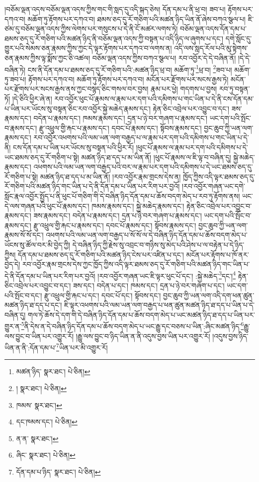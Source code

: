།བཅོམ་ལྡན་འདས་བཅོམ་ལྡན་འདས་ཀྱིས་གང་གི་སླད་དུ་འདི་སྐད་ཅེས། དོན་དམ་པ་ནི་ཕྲ་བ། ཟབ་པ། རྟོགས་པར་དཀའ་བ། མཆོག་ཏུ་རྟོགས་པར་དཀའ་བ། ཐམས་ཅད་དུ་རོ་གཅིག་པའི་མཚན་ཉིད་ཡིན་ནོ་ཞེས་བཀའ་སྩལ་པ། ཇི་ཙམ་དུ་བཅོམ་ལྡན་འདས་ཀྱིས་ལེགས་པར་གསུངས་པ་དེ་ནི་ངོ་མཚར་ལགས་ཏེ། བཅོམ་ལྡན་འདས་དོན་དམ་པ་ཐམས་ཅད་དུ་རོ་གཅིག་པའི་མཚན་ཉིད་ནི་བཅོམ་ལྡན་འདས་ཀྱི་བསྟན་པ་འདི་ཉིད་ལ་ཞུགས་པ་དང་། དགེ་སློང་དུ་གྱུར་པའི་སེམས་ཅན་རྣམས་ཀྱིས་ཀྱང་དེ་ལྟར་རྟོགས་པར་དཀའ་བ་ལགས་ན། འདི་ལས་སླད་རོལ་པའི་མུ་སྟེགས་ཅན་རྣམས་ཀྱིས་ལྟ་སྨོས་ཀྱང་ཅི་འཚལ། བཅོམ་ལྡན་འདས་ཀྱིས་བཀའ་སྩལ་པ། རབ་འབྱོར་དེ་དེ་བཞིན་ནོ། །དེ་དེ་བཞིན་ཏེ། ངས་ནི་དོན་དམ་པ་ཐམས་ཅད་དུ་རོ་གཅིག་པའི་:མཚན་ཉིད་ཕྲ་བ། མཆོག་ཏུ་\footnote{མཚན་ཉིད་  སྣར་ཐང་།  པེ་ཅིན། }ཕྲ་བ། \footnote{།    སྣར་ཐང་།  པེ་ཅིན། }ཟབ་པ། མཆོག་ཏུ་ཟབ་པ། རྟོགས་པར་དཀའ་བ། མཆོག་ཏུ་རྟོགས་པར་དཀའ་བ། མངོན་པར་རྫོགས་པར་སངས་རྒྱས་ཏེ། མངོན་པར་རྫོགས་པར་སངས་རྒྱས་ནས་ཀྱང་བསྙད་ཅིང་གསལ་བར་བྱས། རྣམ་པར་ཕྱེ། གདགས་པ་བྱས། རབ་ཏུ་བསྟན་ཏོ། །དེ་ཅིའི་ཕྱིར་ཞེ་ན། རབ་འབྱོར་ཕུང་པོ་རྣམས་ལ་རྣམ་པར་དག་པའི་དམིགས་པ་གང་ཡིན་པ་དེ་ནི་ངས་དོན་དམ་པ་ཡིན་པར་ཡོངས་སུ་བསྟན་ཅིང་རབ་འབྱོར་སྐྱེ་མཆེད་རྣམས་དང་། རྟེན་ཅིང་འབྲེལ་པར་འབྱུང་བ་དང་། ཟས་རྣམས་དང་། བདེན་པ་རྣམས་དང་། ཁམས་རྣམས་དང་། དྲན་པ་ཉེ་བར་གཞག་པ་རྣམས་དང་། ཡང་དག་པའི་སྤོང་བ་རྣམས་དང་། རྫུ་འཕྲུལ་གྱི་རྐང་པ་རྣམས་དང་། དབང་པོ་རྣམས་དང་། སྟོབས་རྣམས་དང་། བྱང་ཆུབ་ཀྱི་ཡན་ལག་རྣམས་དང་། རབ་འབྱོར་འཕགས་པའི་ལམ་ཡན་ལག་བརྒྱད་པ་ལ་རྣམ་པར་དག་པའི་དམིགས་པ་གང་ཡིན་པ་དེ་ནི། ངས་དོན་དམ་པ་ཡིན་པར་ཡོངས་སུ་བསྟན་པའི་ཕྱིར་རོ། །ཕུང་པོ་རྣམས་ལ་རྣམ་པར་དག་པའི་དམིགས་པ་དེ་ཡང་ཐམས་ཅད་དུ་རོ་གཅིག་པ་སྟེ། མཚན་ཉིད་ཐ་དད་པ་མ་ཡིན་ནོ། །ཕུང་པོ་རྣམས་ལ་ཇི་ལྟ་བ་བཞིན་དུ། སྐྱེ་མཆེད་རྣམས་དང་། འཕགས་པའི་ལམ་ཡན་ལག་བརྒྱད་པའི་བར་ལ་རྣམ་པར་དག་པའི་དམིགས་པ་དེ་ཡང་ཐམས་ཅད་དུ་རོ་གཅིག་པ་སྟེ། མཚན་ཉིད་ཐ་དད་པ་མ་ཡིན་ནོ། །རབ་འབྱོར་རྣམ་གྲངས་དེས་ན། ཁྱོད་ཀྱིས་འདི་ལྟར་ཐམས་ཅད་དུ་རོ་གཅིག་པའི་མཚན་ཉིད་གང་ཡིན་པ་དེ་ནི་དོན་དམ་པ་ཡིན་པར་རིག་པར་བྱའོ། །རབ་འབྱོར་གཞན་ཡང་དགེ་སློང་རྣལ་འབྱོར་སྤྱོད་པ་ནི་ཕུང་པོ་གཅིག་གི་དེ་བཞིན་ཉིད་དོན་དམ་པ་ཆོས་བདག་མེད་པ་རབ་ཏུ་རྟོགས་ནས། ཡང་དེ་ལས་གཞན་པའི་ཕུང་པོ་རྣམས་དང་། ཁམས་རྣམས་དང་། སྐྱེ་མཆེད་རྣམས་དང་། རྟེན་ཅིང་འབྲེལ་པར་འབྱུང་བ་རྣམས་དང་། ཟས་རྣམས་དང་། བདེན་པ་རྣམས་དང་། དྲན་པ་ཉེ་བར་གཞག་པ་རྣམས་དང་། ཡང་དག་པའི་སྤོང་བ་རྣམས་དང་། རྫུ་འཕྲུལ་གྱི་རྐང་པ་རྣམས་དང་། དབང་པོ་རྣམས་དང་། སྟོབས་རྣམས་དང་། བྱང་ཆུབ་ཀྱི་ཡན་ལག་རྣམས་སོ་སོ་དང་། འཕགས་པའི་ལམ་ཡན་ལག་བརྒྱད་པ་སོ་སོ་ལ་དེ་བཞིན་ཉིད་དོན་དམ་པ་ཆོས་བདག་མེད་པ་ཡོངས་སུ་ཚོལ་བར་མི་བྱེད་ཀྱི། དེ་བཞིན་ཉིད་ཀྱི་རྗེས་སུ་འབྲང་བ་གཉིས་སུ་མེད་པའི་ཤེས་པ་ལ་བརྟེན་པ་དེ་ཉིད་ཀྱིས། དོན་དམ་པ་ཐམས་ཅད་དུ་རོ་གཅིག་པའི་མཚན་ཉིད་ངེས་པར་འཛིན་པ་དང་། མངོན་པར་རྟོགས་པ་ཁོ་ནར་བྱེད་དེ། རབ་འབྱོར་རྣམ་གྲངས་དེས་ཀྱང་ཁྱོད་ཀྱིས་འདི་ལྟར་ཐམས་ཅད་དུ་རོ་གཅིག་པའི་མཚན་ཉིད་གང་ཡིན་པ་དེ་ནི་དོན་དམ་པ་ཡིན་པར་རིག་པར་བྱའོ། །རབ་འབྱོར་གཞན་ཡང་ཇི་ལྟར་ཕུང་པོ་དང་། :སྐྱེ་མཆེད་\footnote{ཁམས་  སྣར་ཐང་། }དང་།\footnote{དང་ཁམས་དང་།  པེ་ཅིན། } རྟེན་ཅིང་འབྲེལ་པར་འབྱུང་བ་དང་། ཟས་དང་། བདེན་པ་དང་། ཁམས་དང་། དྲན་པ་ཉེ་བར་གཞག་པ་དང་། ཡང་དག་པའི་སྤོང་བ་དང་། རྫུ་འཕྲུལ་གྱི་རྐང་པ་དང་། དབང་པོ་དང་། སྟོབས་དང་། བྱང་ཆུབ་ཀྱི་ཡན་ལག་འདི་དག་ཕན་ཚུན་མཚན་ཉིད་ཐ་དད་པ་དང་། ཇི་ལྟར་འཕགས་པའི་ལམ་ཡན་ལག་བརྒྱད་པ་ཕན་ཚུན་མཚན་ཉིད་ཐ་དད་པ་ཡིན་པ་དེ་བཞིན་དུ། གལ་ཏེ་ཆོས་དེ་དག་གི་དེ་བཞིན་ཉིད་དོན་དམ་པ་ཆོས་བདག་མེད་པ་ཡང་མཚན་ཉིད་ཐ་དད་པ་ཡིན་པར་གྱུར་ན་\footnote{ན་ན་  སྣར་ཐང་། }ནི་དེས་ན་དེ་བཞིན་ཉིད་དོན་དམ་པ་ཆོས་བདག་མེད་པ་ཡང་རྒྱུ་དང་བཅས་པ་ཡིན་:ཞིང་མཚན་ཉིད་\footnote{ཞིང་  སྣར་ཐང་།  པེ་ཅིན། }རྒྱུ་ལས་བྱུང་བ་ཡིན་པར་འགྱུར་རོ། །རྒྱུ་ལས་བྱུང་བ་ཉིད་ཡིན་ན་ནི་འདུས་བྱས་ཡིན་པར་འགྱུར་རོ། །འདུས་བྱས་ཉིད་ཡིན་ན་ནི་:དོན་དམ་པ་\footnote{དོན་དམ་པ་ཉིད་  སྣར་ཐང་།  པེ་ཅིན། }ཡིན་པར་མི་འགྱུར་རོ། 